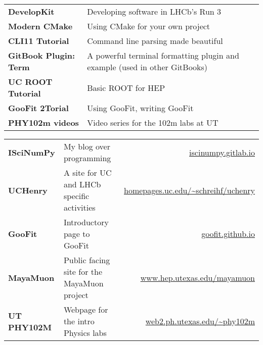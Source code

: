 \documentclass[10pt,letterpaper,english]{moderncv}
\begin{document}

\begin{tabularx}{\textwidth}{>{\bfseries}p{1.45in}X}
DevelopKit & Developing software in LHCb’s Run 3 \\
Modern CMake & Using CMake for your own project \\
CLI11 Tutorial & Command line parsing made beautiful \\
GitBook Plugin: Term & A powerful terminal formatting plugin and example (used in other GitBooks) \\
UC ROOT Tutorial & Basic ROOT for HEP \\
GooFit 2Torial & Using GooFit, writing GooFit \\
PHY102m videos & Video series for the 102m labs at UT \\
\end{tabularx}


\begin{tabularx}{\textwidth}{>{\bfseries}p{1.45in}Xr}
ISciNumPy & My blog over programming & \url{iscinumpy.gitlab.io} \\
UCHenry & A site for UC and LHCb specific activities& \url{homepages.uc.edu/~schreihf/uchenry}  \\
GooFit & Introductory page to GooFit & \url{goofit.github.io} \\
MayaMuon & Public facing site for the MayaMuon project & \url{www.hep.utexas.edu/mayamuon} \\
UT PHY102M & Webpage for the intro Physics labs & \url{web2.ph.utexas.edu/~phy102m}  \\
\end{tabularx}
\end{document}
